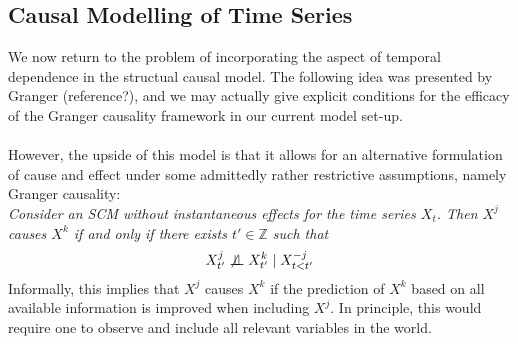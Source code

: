 \documentclass[11pt, a4paper]{memoir}
\theoremstyle{break}
\theoremstyle{break}
\theoremstyle{nonumberplain}
\newcommand{\mZ}{\mathbb{Z}}
\newcommand{\indep}{\perp \!\!\! \perp}
\begin{document}
\subsection{Causal Modelling of Time Series}
We now return to the problem of incorporating the aspect of temporal dependence in the structual causal model.
The following idea was presented by Granger (reference?), and we may actually give explicit conditions for the efficacy of the Granger causality framework in our current model set-up.\\\\
However, the upside of this model is that it allows for an alternative formulation of cause and effect under some admittedly rather restrictive assumptions, namely Granger causality:\\
\textit{Consider an SCM without instantaneous effects for the time series $X_t$. Then $X^j$ causes $X^k$ if and only if there exists $t'\in \mZ$ such that
$$X_{t'}^j\centernot \indep X_{t'}^k\mid X_{t<t'}^{-j}$$}
Informally, this implies that $X^j$ causes $X^k$ if the prediction of $X^k$ based on all available information is improved when including $X^j$. In principle, this would require one to observe and include all relevant variables in the world.\\
\end{document}
